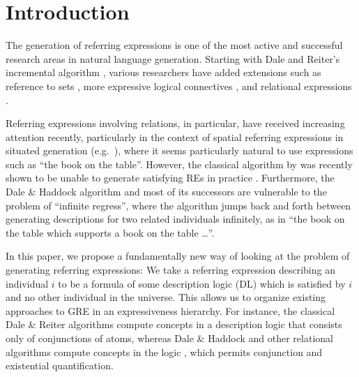 \section{Introduction} \label{sec:introduction}

The generation of referring expressions is one of the most active and
successful research areas in natural language generation.  Starting with Dale and Reiter's
incremental algorithm \cite{Dale1995}, various researchers have added
extensions such as reference to sets \cite{Stone2000}, more expressive
logical connectives \cite{deemter01:_gener_refer_expres}, and
relational expressions \cite{dale91:_gener_refer_expres_invol_relat}.

Referring expressions involving relations, in particular, have
received increasing attention recently, particularly in the context of
spatial referring expressions in situated generation (e.g.\
\cite{kelleher06:_increm_gener_of_spatial_refer}), where it seems
particularly natural to use expressions such as ``the book on the
table''.  However, the classical algorithm by
 was recently shown to
be unable to generate satisfying REs in practice
\cite{viethen06:_algor_for_gener_refer_expres}.  Furthermore, the Dale
\& Haddock algorithm and most of its successors
\cite{Krahmer2003,kelleher06:_increm_gener_of_spatial_refer} are
vulnerable to the problem of ``infinite regress'', where the algorithm
jumps back and forth between generating descriptions for two related
individuals infinitely, as in ``the book on the table which supports a
book on the table \ldots''.

In this paper, we propose a fundamentally new way of looking at the
problem of generating referring expressions: We take a referring
expression describing an individual $i$ to be a formula of some
description logic (DL) which is satisfied by $i$ and no other
individual in the universe.  This allows us to organize existing
approaches to GRE in an expressiveness hierarchy.  For instance, the
classical Dale \& Reiter algorithms compute concepts in a description
logic that consists only of conjunctions of atoms, whereas Dale \&
Haddock and other relational algorithms compute concepts in the logic
\el, which permits conjunction and existential quantification.

